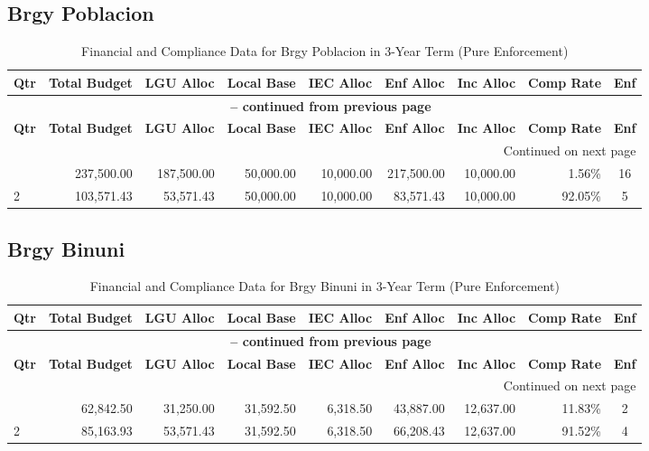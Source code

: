 \subsection{Brgy Poblacion}
\begin{longtable}{lrrrrrrrc}
\caption{Financial and Compliance Data for Brgy Poblacion in 3-Year Term (Pure Enforcement)} \\
\toprule
\textbf{Qtr} & \textbf{Total Budget} & \textbf{LGU Alloc} & \textbf{Local Base} & \textbf{IEC Alloc} & \textbf{Enf Alloc} & \textbf{Inc Alloc} & \textbf{Comp Rate} & \textbf{Enf} \\
\midrule
\endfirsthead
\multicolumn{9}{c}{{\bfseries \tablename\ \thetable{} -- continued from previous page}} \\
\toprule
\textbf{Qtr} & \textbf{Total Budget} & \textbf{LGU Alloc} & \textbf{Local Base} & \textbf{IEC Alloc} & \textbf{Enf Alloc} & \textbf{Inc Alloc} & \textbf{Comp Rate} & \textbf{Enf} \\
\midrule
\endhead
\hline \multicolumn{9}{r}{{Continued on next page}} \\ \hline
\endfoot
\bottomrule
\endlastfoot
1 & 237,500.00 & 187,500.00 & 50,000.00 & 10,000.00 & 217,500.00 & 10,000.00 & 1.56\% & 16 \\
2 & 103,571.43 & 53,571.43 & 50,000.00 & 10,000.00 & 83,571.43 & 10,000.00 & 92.05\% & 5 \\
\end{longtable}
\newpage
\subsection{Brgy Binuni}
\begin{longtable}{lrrrrrrrc}
\caption{Financial and Compliance Data for Brgy Binuni in 3-Year Term (Pure Enforcement)} \\
\toprule
\textbf{Qtr} & \textbf{Total Budget} & \textbf{LGU Alloc} & \textbf{Local Base} & \textbf{IEC Alloc} & \textbf{Enf Alloc} & \textbf{Inc Alloc} & \textbf{Comp Rate} & \textbf{Enf} \\
\midrule
\endfirsthead
\multicolumn{9}{c}{{\bfseries \tablename\ \thetable{} -- continued from previous page}} \\
\toprule
\textbf{Qtr} & \textbf{Total Budget} & \textbf{LGU Alloc} & \textbf{Local Base} & \textbf{IEC Alloc} & \textbf{Enf Alloc} & \textbf{Inc Alloc} & \textbf{Comp Rate} & \textbf{Enf} \\
\midrule
\endhead
\hline \multicolumn{9}{r}{{Continued on next page}} \\ \hline
\endfoot
\bottomrule
\endlastfoot
1 & 62,842.50 & 31,250.00 & 31,592.50 & 6,318.50 & 43,887.00 & 12,637.00 & 11.83\% & 2 \\
2 & 85,163.93 & 53,571.43 & 31,592.50 & 6,318.50 & 66,208.43 & 12,637.00 & 91.52\% & 4 \\
\end{longtable}
\newpage
